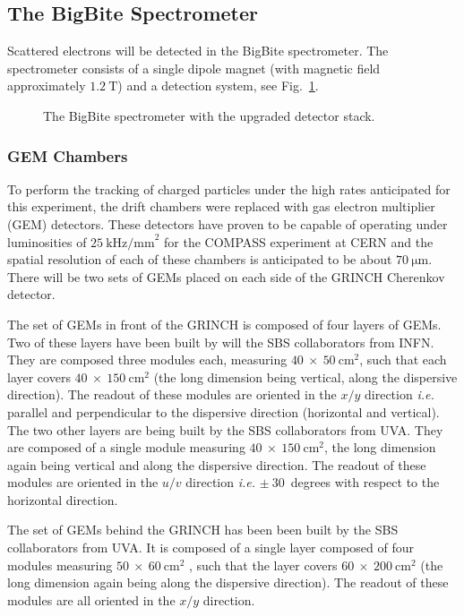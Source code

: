 \subsection{The BigBite Spectrometer}
%
\label{sec:expsetup_bigbite}             
%
Scattered electrons will be detected in the BigBite spectrometer.
The spectrometer consists of a single dipole magnet (with magnetic field approximately $1.2~\mathrm{T}$) and a detection system, see Fig.~\ref{fig:BB}.  

\begin{figure}[htbp]
\begin{center}
\end{center}
\caption{The BigBite spectrometer with the upgraded detector stack.}
\label{fig:BB}
\end{figure} 

\subsubsection{GEM Chambers}
To perform the tracking of charged particles under the high rates anticipated for this experiment, the drift chambers were replaced with gas electron multiplier (GEM) detectors.  
These detectors have proven to be capable of operating under luminosities of $25~\mathrm{kHz/mm}^2$ for the COMPASS experiment at CERN and the spatial resolution of each of these chambers is anticipated to be about $70~\mathrm{\mu m}$.
There will be two sets of GEMs placed on each side of the GRINCH Cherenkov detector.

The set of GEMs in front of the GRINCH is composed of four layers of GEMs.
Two of these layers have been built by will the SBS collaborators from INFN.
They are composed three modules each, measuring $40~\times~50~\mathrm{cm}^2$, such that each layer covers $40~\times~150~\mathrm{cm}^2$ (the long dimension being vertical, along the dispersive direction). The readout of these modules are oriented in the $x/y$ direction {\it i.e.} parallel and perpendicular to the dispersive direction (horizontal and vertical).
The two other layers are being built by the SBS collaborators from UVA. They are composed of a single module measuring $40~\times~150~\mathrm{cm}^2$, the long dimension again being vertical and along the dispersive direction.
The readout of these modules are oriented in the $u/v$ direction {\it i.e.} $\pm~30$~degrees with respect to the horizontal direction.

The set of GEMs behind the GRINCH has been been built by the SBS collaborators from UVA. It is composed of a single layer composed of four modules measuring $50~\times~60~\mathrm{cm}^2$ , such that the layer covers $60~\times~200~\mathrm{cm}^2$ (the long dimension again being along the dispersive direction).
The readout of these modules are all oriented in the $x/y$ direction.

